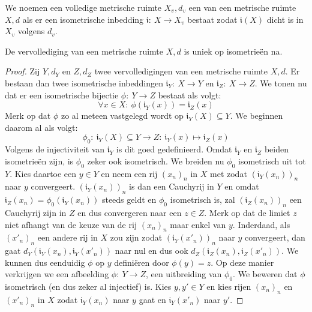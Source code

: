\documentclass[main.tex]{subfiles}
\begin{document}
\begin{de}
  We noemen een volledige metrische ruimte $X_{v},d_{v}$ een  van een metrische ruimte $X,d$ als er een isometrische inbedding $\mathfrak{i}:\ X \rightarrow X_{v}$ bestaat zodat $\mathfrak{i}(X)$ dicht is in $X_{v}$ volgens $d_{v}$.
\end{de}

\begin{bst}
  De vervollediging van een metrische ruimte $X,d$ is uniek op isometrie\"en na.

  \begin{proof}
    Zij $Y,d_{Y}$ en $Z,d_{Z}$ twee vervolledigingen van een metrische ruimte $X,d$.
    Er bestaan dan twee isometrische inbeddingen $\mathfrak{i}_{Y}:\ X \rightarrow Y$ en $\mathfrak{i}_{Z}:\ X \rightarrow Z$.
    We tonen nu dat er een isometrische bijectie $\phi:\ Y \rightarrow Z$ bestaat als volgt:
    \[ \forall x\in X:\ \phi(\mathfrak{i}_{Y}(x)) = \mathfrak{i}_{Z}(x) \]
    Merk op dat $\phi$ zo al meteen vastgelegd wordt op $\mathfrak{i}_{Y}(X) \subseteq Y$.
    We beginnen daarom al als volgt:
    \[ \phi_{0}:\ \mathfrak{i}_{Y}(X) \subseteq Y \rightarrow Z:\ \mathfrak{i}_{Y}(x) \mapsto \mathfrak{i}_{Z}(x) \] 
    Volgens de injectiviteit van $\mathfrak{i}_{Y}$ is dit goed gedefinieerd.
    Omdat $\mathfrak{i}_{Y}$ en $\mathfrak{i}_{Z}$ beiden isometrie\"en zijn, is $\phi_{0}$ zeker ook isometrisch.
    We breiden nu $\phi_{0}$ isometrisch uit tot $Y$.
    Kies daartoe een $y\in Y$ en neem een rij $(x_{n})_{n}$ in $X$ met zodat $(\mathfrak{i}_{Y}(x_{n}))_{n}$ naar $y$ convergeert.
    $(\mathfrak{i}_{Y}(x_{n}))_{n}$ is dan een Cauchyrij in $Y$ en omdat $\mathfrak{i}_{Z}(x_{n}) = \phi_{0}(\mathfrak{i}_{Y}(x_{n}))$ steeds geldt en $\phi_{0}$ isometrisch is, zal $\left(\mathfrak{i}_{Z}(x_{n})\right)_{n}$ een Cauchyrij zijn in $Z$ en dus convergeren naar een $z\in Z$.
    Merk op dat de limiet $z$ niet afhangt van de keuze van de rij $(x_{n})_{n}$ maar enkel van $y$.
    Inderdaad, als $(x'_{n})_{n}$ een andere rij in $X$ zou zijn zodat $\left(\mathfrak{i}_{Y}(x'_{n})\right)_{n}$ naar $y$ convergeert, dan gaat $d_{Y}(\mathfrak{i}_{Y}(x_{n}),\mathfrak{i}_{Y}(x'_{n}))$ naar nul en dus ook $d_{Z}(\mathfrak{i}_{Z}(x_{n}),\mathfrak{i}_{Z}(x'_{n}))$.
    We kunnen dus eenduidig $\phi$ op $y$ defini\"eren door $\phi(y) = z$.
    Op deze manier verkrijgen we een afbeelding $\phi:\ Y \rightarrow Z$, een uitbreiding van $\phi_{0}$.
    We beweren dat $\phi$ isometrisch (en dus zeker al injectief) is.
    Kies $y,y'\in Y$ en kies rijen $(x_{n})_{n}$ en $(x'_{n})_{n}$ in $X$ zodat $\mathfrak{i}_{Y}(x_{n})$ naar $y$ gaat en $\mathfrak{i}_{Y}(x'_{n})$ naar $y'$.

\end{proof}
\end{bst}
\end{document}
